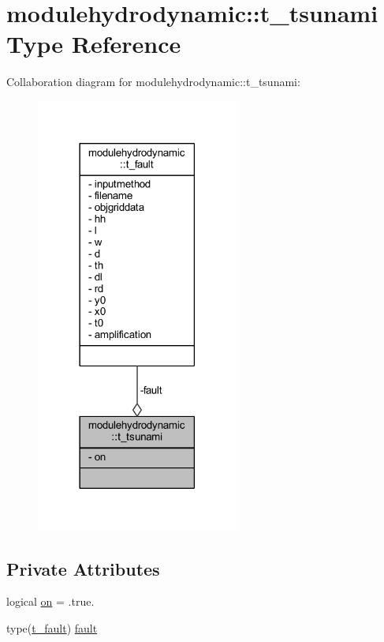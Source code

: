 \hypertarget{structmodulehydrodynamic_1_1t__tsunami}{}\section{modulehydrodynamic\+:\+:t\+\_\+tsunami Type Reference}
\label{structmodulehydrodynamic_1_1t__tsunami}


Collaboration diagram for modulehydrodynamic\+:\+:t\+\_\+tsunami\+:\nopagebreak
\begin{figure}[H]
\begin{center}
\leavevmode
\includegraphics[width=189pt]{structmodulehydrodynamic_1_1t__tsunami__coll__graph}
\end{center}
\end{figure}
\subsection*{Private Attributes}
\begin{DoxyCompactItemize}
\item 
logical \mbox{\hyperlink{structmodulehydrodynamic_1_1t__tsunami_a49d56df9231f3affed6303d2a0aa6972}{on}} = .true.
\item 
type(\mbox{\hyperlink{structmodulehydrodynamic_1_1t__fault}{t\+\_\+fault}}) \mbox{\hyperlink{structmodulehydrodynamic_1_1t__tsunami_a304619e5a882ca7ff8da2eba5e91313b}{fault}}
\end{DoxyCompactItemize}


